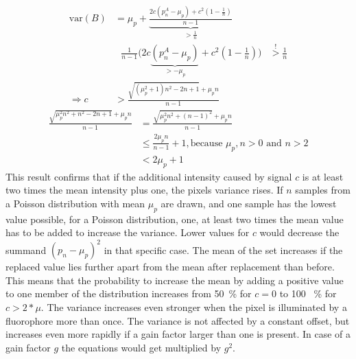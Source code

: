 \begin{align}
\text{var}(B)&=\mu_p+\underbrace{\frac{2c\left(p_n^A-\mu_p\right)+c^2 \left(1-\frac{1}{n}\right)}{n-1}}_{>\frac{1}{n}}\label{gliwa}\\
&~~~\frac{1}{n-1}\Big(2c\underbrace{\left(p_n^A-\mu_p\right)}_{> -\mu_p}+c^2 \left(1-\frac{1}{n}\right)\Big)&\overset{!}{>}\frac{1}{n}\\
\Rightarrow c &>\frac{\sqrt{\left(\mu_p^2+1\right)n^2-2n+1}+\mu_pn}{n-1}
\end{align}
\begin{align}
\frac{\sqrt{\mu_p^2n^2+n^2-2n+1}+\mu_pn}{n-1}&=\frac{\sqrt{\mu_p^2n^2+(n-1)^2}+\mu_pn}{n-1}\\
&\leq \frac{2\mu_p n}{n-1}+1 ,\text{because $\mu_p, n>0$ and $n>2$}\\
&< 2\mu_p + 1
\end{align}
This result confirms that if the additional intensity caused by signal $c$ is at least two times the mean intensity plus one, the pixels variance rises.\newline
If $n$ samples from a Poisson distribution with mean $\mu_p$ are drawn, and one sample has the lowest value possible, for a Poisson distribution, one, at least two times the mean value has to be added to increase the variance. Lower values for $c$ would decrease the summand $(p_n - \mu_p)^2$ in that specific case. The mean of the set increases if the replaced value lies further apart from the mean after replacement than before. This means that the probability to increase the mean by adding a positive value to one member of the distribution increases from 50~\% for $c=0$ to 100~
\% for $c>2*\mu$.\newline
The variance increases even stronger when the pixel is illuminated by a fluorophore more than once. The variance is not affected by a constant offset, but increases even more rapidly if a gain factor larger than one is present. In case of a gain factor $g$ the equations would get multiplied by $g^2$.\newline

